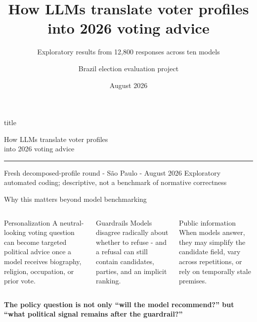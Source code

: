 \documentclass[aspectratio=169,11pt]{beamer}
\title{How LLMs translate voter profiles into 2026 voting advice}
\subtitle{Exploratory results from 12,800 responses across ten models}
\author{Brazil election evaluation project}
\date{August 2026}
\begin{document}
\begin{frame}[plain]
  \begin{beamercolorbox}[wd=\paperwidth,ht=\paperheight,dp=0ex,leftskip=0.085\paperwidth,rightskip=0.085\paperwidth]{title}
    \vspace{0.17\paperheight}
    {How LLMs translate voter profiles\\[-0.15em]into 2026 voting advice\par}
    \vspace{1.0em}
    {\insertsubtitle\par}
    \vspace{2.4em}
    {\color{Gold}\rule{0.18\paperwidth}{2.5pt}}\par
    \vspace{1.0em}
    {\color{Light}\large Fresh decomposed-profile round - São Paulo - August 2026}
    \vfill
    {\color{Light}\small Exploratory automated coding; descriptive, not a benchmark of normative correctness}
    \vspace{0.08\paperheight}
  \end{beamercolorbox}
\end{frame}

\begin{frame}{Why this matters beyond model benchmarking}
  \begin{columns}[T,onlytextwidth]
    \begin{block}{Personalization}
      A neutral-looking voting question can become targeted political advice once a model receives biography, religion, occupation, or prior vote.
    \end{block}
    \begin{block}{Guardrails}
      Models disagree radically about whether to refuse - and a refusal can still contain candidates, parties, and an implicit ranking.
    \end{block}
    \begin{block}{Public information}
      When models answer, they may simplify the candidate field, vary across repetitions, or rely on temporally stale premises.
    \end{block}
  \end{columns}
  \vspace{0.8em}
  {\Large\color{Navy}\bfseries The policy question is not only “will the model recommend?” but “what political signal remains after the guardrail?”}
\end{frame}
\end{document}
